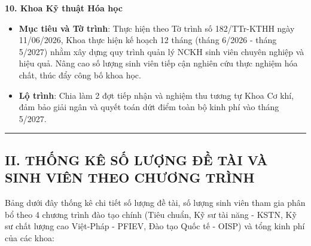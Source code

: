 \documentclass[11pt,a4paper]{article}
\providecommand{\tightlist}{%
  \setlength{\itemsep}{0pt}\setlength{\parskip}{0pt}}
\begin{document}
\textbf{10. Khoa Kỹ thuật Hóa học}

\begin{itemize}
\tightlist
\item
  \textbf{Mục tiêu và Tờ trình}: Thực hiện theo Tờ trình số 182/TTr-KTHH
  ngày 11/06/2026, Khoa thực hiện kế hoạch 12 tháng (tháng 6/2026 -
  tháng 5/2027) nhằm xây dựng quy trình quản lý NCKH sinh viên chuyên
  nghiệp và hiệu quả. Nâng cao số lượng sinh viên tiếp cận nghiên cứu
  thực nghiệm hóa chất, thúc đẩy công bố khoa học.
\item
  \textbf{Lộ trình}: Chia làm 2 đợt tiếp nhận và nghiệm thu tương tự
  Khoa Cơ khí, đảm bảo giải ngân và quyết toán dứt điểm toàn bộ kinh phí
  vào tháng 5/2027.
\end{itemize}

\begin{center}\rule{0.5\linewidth}{0.5pt}\end{center}

\subsection{II. THỐNG KÊ SỐ LƯỢNG ĐỀ TÀI VÀ SINH VIÊN THEO CHƯƠNG
TRÌNH}\label{ii.-thux1ed1ng-kuxea-sux1ed1-lux1b0ux1ee3ng-ux111ux1ec1-tuxe0i-vuxe0-sinh-viuxean-theo-chux1b0ux1a1ng-truxecnh}

Bảng dưới đây thống kê chi tiết số lượng đề tài, số lượng sinh viên tham
gia phân bổ theo 4 chương trình đào tạo chính (Tiêu chuẩn, Kỹ sư tài
năng - KSTN, Kỹ sư chất lượng cao Việt-Pháp - PFIEV, Đào tạo Quốc tế -
OISP) và tổng kinh phí của các khoa:
\end{document}
